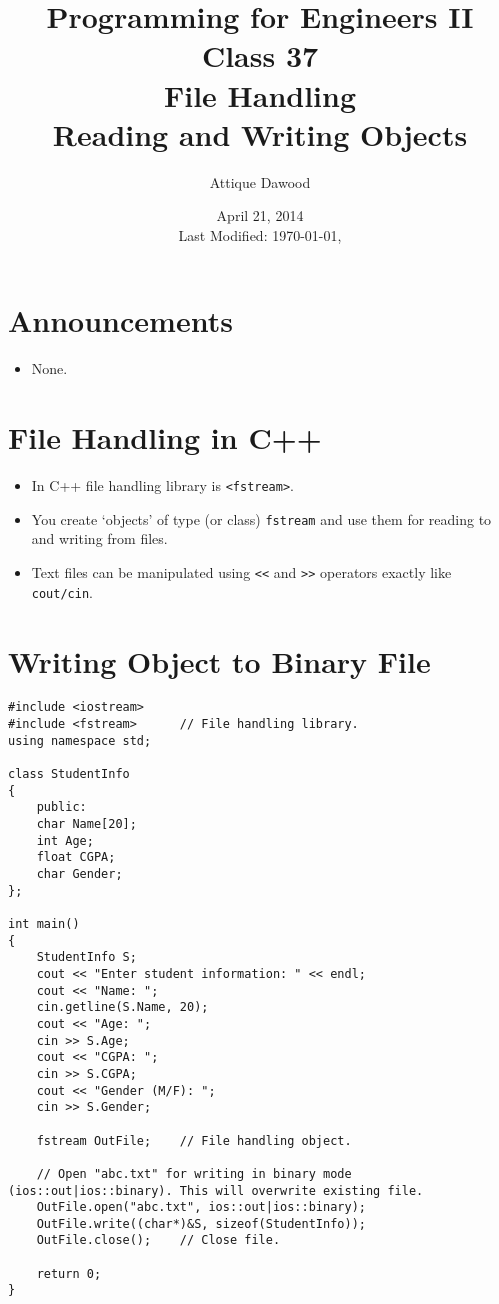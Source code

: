 \documentclass[12pt,a4paper]{article}
\title{\vspace{-2cm}Programming for Engineers II\\Class 37\\File Handling\\Reading and Writing Objects}
\author{Attique Dawood}
\date{April 21, 2014\\[0.2cm] Last Modified: \today, \currenttime}
\begin{document}
\maketitle
\section{Announcements}
\begin{itemize}
\item None.
\end{itemize}
\section{File Handling in C++}
\begin{itemize}
\item In C++ file handling library is \verb|<fstream>|.
\item You create `objects' of type (or class) \verb|fstream| and use them for reading to and writing from files.
\item Text files can be manipulated using \verb|<<| and \verb|>>| operators exactly like \verb|cout/cin|.
\end{itemize}
\section{Writing Object to Binary File}
\begin{lstlisting}[caption={Writing an object to binary file}]
#include <iostream>
#include <fstream>		// File handling library.
using namespace std;

class StudentInfo
{
	public:
	char Name[20];
	int Age;
	float CGPA;
	char Gender;
};

int main()
{
	StudentInfo S;
	cout << "Enter student information: " << endl;
	cout << "Name: ";
	cin.getline(S.Name, 20);
	cout << "Age: ";
	cin >> S.Age;
	cout << "CGPA: ";
	cin >> S.CGPA;
	cout << "Gender (M/F): ";
	cin >> S.Gender;

	fstream OutFile;	// File handling object.

	// Open "abc.txt" for writing in binary mode (ios::out|ios::binary). This will overwrite existing file.
	OutFile.open("abc.txt", ios::out|ios::binary);
	OutFile.write((char*)&S, sizeof(StudentInfo));
	OutFile.close();	// Close file.

	return 0;
}
\end{lstlisting}
\newpage
\end{document}

